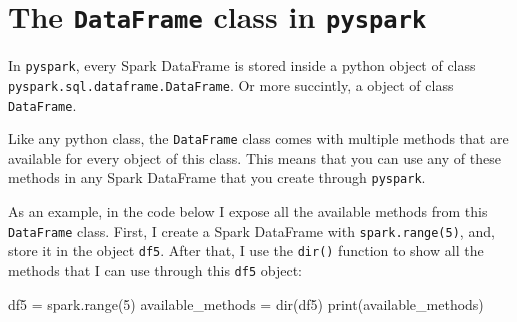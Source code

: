 \documentclass[
  11pt,
  letterpaper,
  DIV=11,
  numbers=noendperiod]{scrreprt}
\newenvironment{Shaded}{\begin{snugshade}}{\end{snugshade}}
\newcommand{\BuiltInTok}[1]{\textcolor[rgb]{0.00,0.23,0.31}{#1}}
\newcommand{\DecValTok}[1]{\textcolor[rgb]{0.68,0.00,0.00}{#1}}
\newcommand{\NormalTok}[1]{\textcolor[rgb]{0.00,0.23,0.31}{#1}}
\newcommand{\OperatorTok}[1]{\textcolor[rgb]{0.37,0.37,0.37}{#1}}
\begin{document}
\section{\texorpdfstring{The \texttt{DataFrame} class in
\texttt{pyspark}}{The DataFrame class in pyspark}}\label{sec-dataframe-class}

In \texttt{pyspark}, every Spark DataFrame is stored inside a python
object of class \texttt{pyspark.sql.dataframe.DataFrame}. Or more
succintly, a object of class \texttt{DataFrame}.

Like any python class, the \texttt{DataFrame} class comes with multiple
methods that are available for every object of this class. This means
that you can use any of these methods in any Spark DataFrame that you
create through \texttt{pyspark}.

As an example, in the code below I expose all the available methods from
this \texttt{DataFrame} class. First, I create a Spark DataFrame with
\texttt{spark.range(5)}, and, store it in the object \texttt{df5}. After
that, I use the \texttt{dir()} function to show all the methods that I
can use through this \texttt{df5} object:

\begin{Shaded}
\begin{Highlighting}[]
\NormalTok{df5 }\OperatorTok{=}\NormalTok{ spark.}\BuiltInTok{range}\NormalTok{(}\DecValTok{5}\NormalTok{)}
\NormalTok{available\_methods }\OperatorTok{=} \BuiltInTok{dir}\NormalTok{(df5)}
\BuiltInTok{print}\NormalTok{(available\_methods)}
\end{Highlighting}
\end{Shaded}
\end{document}
